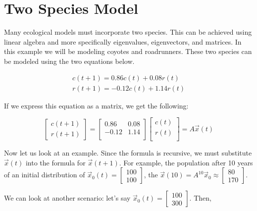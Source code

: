 \documentclass[12pt]{article}
\begin{document}
\section{Two Species Model}
Many ecological models must incorporate two species. This can be achieved using linear algebra and more specifically eigenvalues, eigenvectors, and matrices. In this example we will be modeling coyotes and roadrunners. These two species can be modeled using the two equations below\cite{bretscher_2019}.


\begin{align}
    c(t+1)= 0.86c(t) + 0.08r(t)\\
    r(t+1)= -0.12c(t) + 1.14r(t)
\end{align}

If we express this equation as a matrix, we get the following:

\begin{equation*}
    \begin{bmatrix}
    c(t+1)\\
    r(t+1)
    \end{bmatrix}
    =\begin{bmatrix}
    0.86  &   0.08\\
    -0.12  &    1.14\\
    \end{bmatrix}
    \begin{bmatrix}
    c(t)\\
    r(t)  \\
    \end{bmatrix}
    =A\Vec{x}(t)
\end{equation*}

Now let us look at an example. Since the formula is recursive, we must substitute $\Vec{x}(t)$ into the formula for $\Vec{x}(t+1)$. For example, the population after 10 years of an initial distribution of $\Vec{x}_0(t)=\begin{bmatrix}100\\100\end{bmatrix}$, the $\Vec{x}(10)=A^{10}\Vec{x}_0\approx \begin{bmatrix}80\\170\end{bmatrix}$. 
    
We can look at another scenario: let's say $\Vec{x}_0(t)=\begin{bmatrix}100\\300\end{bmatrix}$. Then,
\end{document}
